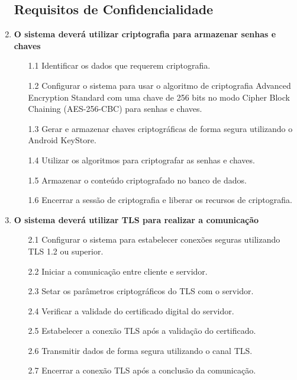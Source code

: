     \begin{enumerate}
    
        \subsection{Requisitos de Confidencialidade}
    
        \item \textbf{O sistema deverá utilizar criptografia para armazenar senhas e chaves}
        \begin{enumerate}
            \item[1.1] Identificar os dados que requerem criptografia.
            \item[1.2] Configurar o sistema para usar o algoritmo de criptografia Advanced Encryption Standard com uma chave de 256 bits no modo Cipher Block Chaining (AES-256-CBC) para senhas e chaves.
            \item[1.3] Gerar e armazenar chaves criptográficas de forma segura utilizando o Android KeyStore.
            \item[1.4] Utilizar os algoritmos para criptografar as senhas e chaves.
            \item[1.5] Armazenar o conteúdo criptografado no banco de dados.
            \item[1.6] Encerrar a sessão de criptografia e liberar os recursos de criptografia.
        \end{enumerate}
        
        \item \textbf{O sistema deverá utilizar TLS para realizar a comunicação}
        \begin{enumerate}
            \item[2.1] Configurar o sistema para estabelecer conexões seguras utilizando TLS 1.2 ou superior.
            \item[2.2] Iniciar a comunicação entre cliente e servidor.
            \item[2.3] Setar os parâmetros criptográficos do TLS com o servidor.
            \item[2.4] Verificar a validade do certificado digital do servidor.
            \item[2.5] Estabelecer a conexão TLS após a validação do certificado.
            \item[2.6] Transmitir dados de forma segura utilizando o canal TLS.
            \item[2.7] Encerrar a conexão TLS após a conclusão da comunicação.
        \end{enumerate}
    

\end{enumerate}
